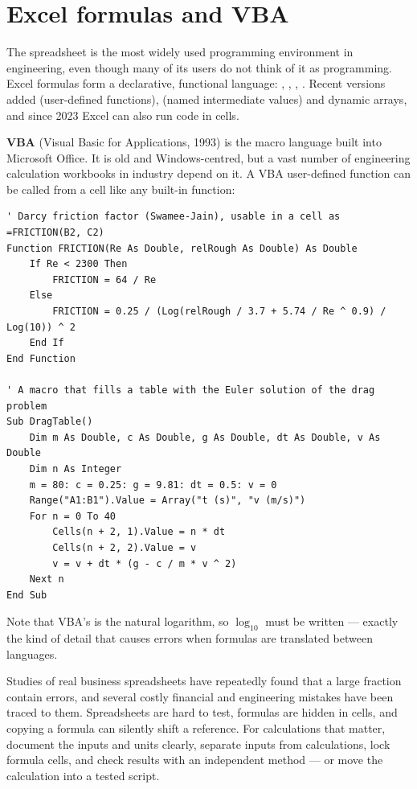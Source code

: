 \section{Excel formulas and VBA}
\label{sec:vba}

The spreadsheet is the most widely used programming environment in engineering, even
though many of its users do not think of it as programming. Excel formulas form a
declarative, functional language: , ,
, . Recent versions added
 (user-defined functions),  (named intermediate values) and dynamic
arrays, and since 2023 Excel can also run \py code in cells.

\textbf{VBA} (Visual Basic for Applications, 1993) is the macro language built into
Microsoft Office. It is old and Windows-centred, but a vast number of engineering
calculation workbooks in industry depend on it. A VBA user-defined function can be called
from a cell like any built-in function:
\begin{lstlisting}[language=VBA]
' Darcy friction factor (Swamee-Jain), usable in a cell as =FRICTION(B2, C2)
Function FRICTION(Re As Double, relRough As Double) As Double
    If Re < 2300 Then
        FRICTION = 64 / Re
    Else
        FRICTION = 0.25 / (Log(relRough / 3.7 + 5.74 / Re ^ 0.9) / Log(10)) ^ 2
    End If
End Function

' A macro that fills a table with the Euler solution of the drag problem
Sub DragTable()
    Dim m As Double, c As Double, g As Double, dt As Double, v As Double
    Dim n As Integer
    m = 80: c = 0.25: g = 9.81: dt = 0.5: v = 0
    Range("A1:B1").Value = Array("t (s)", "v (m/s)")
    For n = 0 To 40
        Cells(n + 2, 1).Value = n * dt
        Cells(n + 2, 2).Value = v
        v = v + dt * (g - c / m * v ^ 2)
    Next n
End Sub
\end{lstlisting}
Note that VBA's  is the natural logarithm, so $\log_{10}$ must be written
 --- exactly the kind of detail that causes errors when formulas are
translated between languages.

\begin{engnote}
Studies of real business spreadsheets have repeatedly found that a large fraction contain
errors, and several costly financial and engineering mistakes have been traced to them.
Spreadsheets are hard to test, formulas are hidden in cells, and copying a formula can
silently shift a reference. For calculations that matter, document the inputs and units
clearly, separate inputs from calculations, lock formula cells, and check results with an
independent method --- or move the calculation into a tested script.
\end{engnote}

